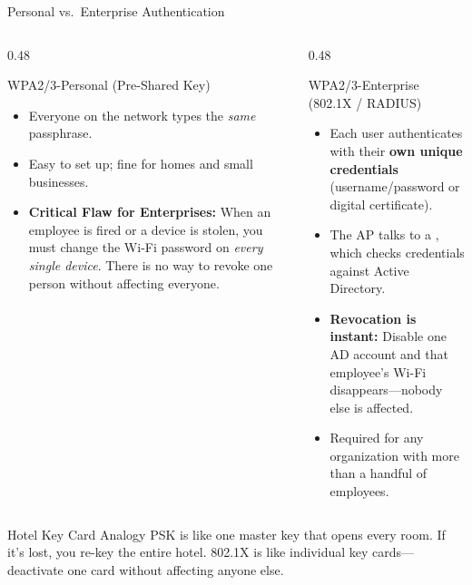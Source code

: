 \documentclass[aspectratio=169]{beamer}
\begin{document}
\begin{frame}{Personal vs.\ Enterprise Authentication}
    \begin{columns}[T]
        \begin{column}{0.48\textwidth}
            \begin{block}{WPA2/3-Personal (Pre-Shared Key)}
                \footnotesize
                \begin{itemize}
                    \item Everyone on the network types the \emph{same} passphrase.
                    \item Easy to set up; fine for homes and small businesses.
                    \item \textbf{Critical Flaw for Enterprises:} When an employee is fired or a device is stolen, you must change the Wi-Fi password on \emph{every single device}. There is no way to revoke one person without affecting everyone.
                \end{itemize}
            \end{block}
        \end{column}
        \begin{column}{0.48\textwidth}
            \begin{block}{WPA2/3-Enterprise (802.1X / RADIUS)}
                \footnotesize
                \begin{itemize}
                    \item Each user authenticates with their \textbf{own unique credentials} (username/password or digital certificate).
                    \item The AP talks to a , which checks credentials against Active Directory.
                    \item \textbf{Revocation is instant:} Disable one AD account and that employee's Wi-Fi disappears---nobody else is affected.
                    \item Required for any organization with more than a handful of employees.
                \end{itemize}
            \end{block}
        \end{column}
    \end{columns}
    \vspace{0.3em}
    \begin{exampleblock}{Hotel Key Card Analogy}
        \footnotesize
        PSK is like one master key that opens every room. If it's lost, you re-key the entire hotel. 802.1X is like individual key cards---deactivate one card without affecting anyone else.
    \end{exampleblock}
\end{frame}
\end{document}
